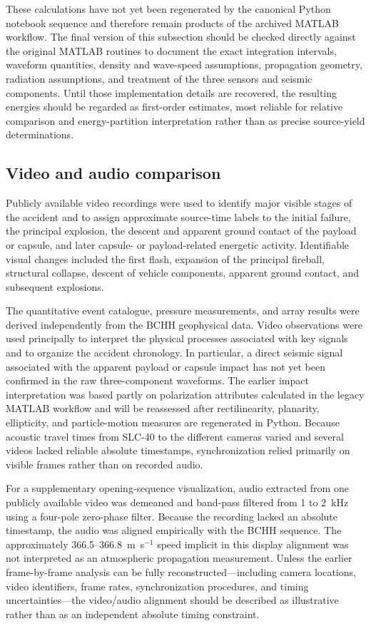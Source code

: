 \documentclass[]{seismica}
\begin{document}
These calculations have not yet been regenerated by the canonical Python notebook sequence and therefore remain products of the archived MATLAB workflow. The final version of this subsection should be checked directly against the original MATLAB routines to document the exact integration intervals, waveform quantities, density and wave-speed assumptions, propagation geometry, radiation assumptions, and treatment of the three sensors and seismic components. Until those implementation details are recovered, the resulting energies should be regarded as first-order estimates, most reliable for relative comparison and energy-partition interpretation rather than as precise source-yield determinations.

\subsection{Video and audio comparison}

Publicly available video recordings were used to identify major visible stages
of the accident and to assign approximate source-time labels to the initial
failure, the principal explosion, the descent and apparent ground contact of
the payload or capsule, and later capsule- or payload-related energetic
activity. Identifiable visual changes included the first flash, expansion of
the principal fireball, structural collapse, descent of vehicle components,
apparent ground contact, and subsequent explosions.

The quantitative event catalogue, pressure measurements, and array results were
derived independently from the BCHH geophysical data. Video observations were
used principally to interpret the physical processes associated with key
signals and to organize the accident chronology. In particular, a direct
seismic signal associated with the apparent payload or capsule impact has not
yet been confirmed in the raw three-component waveforms. The earlier impact
interpretation was based partly on polarization attributes calculated in the
legacy MATLAB workflow and will be reassessed after rectilinearity, planarity,
ellipticity, and particle-motion measures are regenerated in Python. Because
acoustic travel times from SLC-40 to the different cameras varied and several
videos lacked reliable absolute timestamps, synchronization relied primarily
on visible frames rather than on recorded audio.

For a supplementary opening-sequence visualization, audio extracted from one publicly available video was demeaned and band-pass filtered from 1 to 2~kHz using a four-pole zero-phase filter. Because the recording lacked an absolute timestamp, the audio was aligned empirically with the BCHH sequence. The approximately 366.5--366.8~m~s$^{-1}$ speed implicit in this display alignment was not interpreted as an atmospheric propagation measurement. Unless the earlier frame-by-frame analysis can be fully reconstructed---including camera locations, video identifiers, frame rates, synchronization procedures, and timing uncertainties---the video/audio alignment should be described as illustrative rather than as an independent absolute timing constraint.
\end{document}
